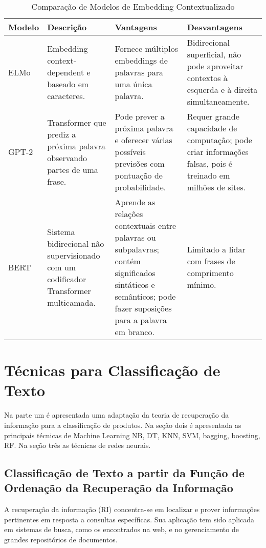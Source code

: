 \begin{table}[h]
\centering
\scriptsize
\begin{tabular}{l|p{3cm}|p{3cm}|p{3cm}}
\hline
\textbf{Modelo} & \textbf{Descrição} & \textbf{Vantagens} & \textbf{Desvantagens} \\
\hline
ELMo & Embedding context-dependent e baseado em caracteres. & Fornece múltiplos embeddings de palavras para uma única palavra. & Bidirecional superficial, não pode aproveitar contextos à esquerda e à direita simultaneamente. \\
\hline
GPT-2 & Transformer que prediz a próxima palavra observando partes de uma frase. & Pode prever a próxima palavra e oferecer várias possíveis previsões com pontuação de probabilidade. & Requer grande capacidade de computação; pode criar informações falsas, pois é treinado em milhões de sites. \\
\hline
BERT & Sistema bidirecional não supervisionado com um codificador Transformer multicamada. & Aprende as relações contextuais entre palavras ou subpalavras; contém significados sintáticos e semânticos; pode fazer suposições para a palavra em branco. & Limitado a lidar com frases de comprimento mínimo. \\
\hline
\end{tabular}
\caption{Comparação de Modelos de Embedding Contextualizado}
\label{tab:wordembcontext}
\end{table}

\section{Técnicas para Classificação de Texto}

Na parte um é apresentada uma adaptação da teoria de recuperação da informação para a classificação de produtos.
Na seção dois é apresentada as principais técnicas de Machine Learning NB, DT, KNN, SVM, bagging, boosting, RF.
Na seção três as técnicas de redes neurais.

\subsection{Classificação de Texto a partir da Função de Ordenação da Recuperação da Informação}

A recuperação da informação (RI) concentra-se em localizar e prover informações pertinentes em resposta a consultas específicas. Sua aplicação tem sido aplicada em sistemas de busca, como os encontrados na web, e no gerenciamento de grandes repositórios de documentos.

